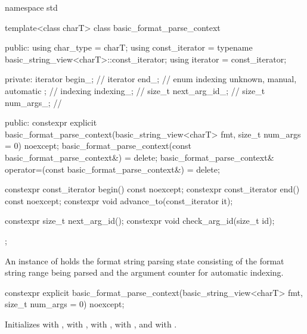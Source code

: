 %
%
%
%
\begin{codeblock}
namespace std {
  template<class charT>
  class basic_format_parse_context {
  public:
    using char_type = charT;
    using const_iterator = typename basic_string_view<charT>::const_iterator;
    using iterator = const_iterator;

  private:
    iterator begin_;                                    // \expos
    iterator end_;                                      // \expos
    enum indexing { unknown, manual, automatic };       // \expos
    indexing indexing_;                                 // \expos
    size_t next_arg_id_;                                // \expos
    size_t num_args_;                                   // \expos

  public:
    constexpr explicit basic_format_parse_context(basic_string_view<charT> fmt,
                                                  size_t num_args = 0) noexcept;
    basic_format_parse_context(const basic_format_parse_context&) = delete;
    basic_format_parse_context& operator=(const basic_format_parse_context&) = delete;

    constexpr const_iterator begin() const noexcept;
    constexpr const_iterator end() const noexcept;
    constexpr void advance_to(const_iterator it);

    constexpr size_t next_arg_id();
    constexpr void check_arg_id(size_t id);
  };
}
\end{codeblock}

\pnum
An instance of  holds
the format string parsing state consisting of
the format string range being parsed and
the argument counter for automatic indexing.

%
\begin{itemdecl}
constexpr explicit basic_format_parse_context(basic_string_view<charT> fmt,
                                              size_t num_args = 0) noexcept;
\end{itemdecl}

\begin{itemdescr}
\pnum
\effects
Initializes
 with ,
 with ,
 with ,
 with , and
 with .
\end{itemdescr}

